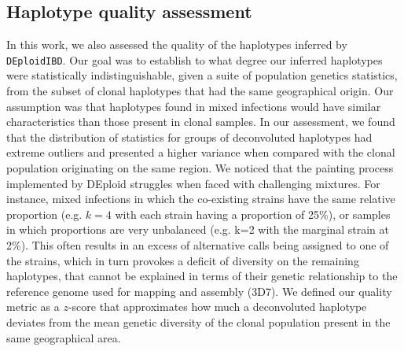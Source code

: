 \documentclass[9pt]{article}
\begin{document}





\subsection{Haplotype quality assessment}
\label{section:hap-quality}
In this work, we also assessed the quality of the haplotypes inferred by \texttt{DEploidIBD}. Our goal was to establish to what degree our inferred haplotypes were statistically indistinguishable, given a suite of population genetics statistics, from the subset of clonal haplotypes that had the same geographical origin. Our assumption was that haplotypes found in mixed infections would have similar characteristics than those present in clonal samples. In our assessment, we found that the distribution of statistics for groups of deconvoluted haplotypes had extreme outliers and presented a higher variance when compared with the clonal population originating on the same region. We noticed that the painting process implemented by DEploid struggles when faced with challenging mixtures. For instance, mixed infections in which the co-existing strains have the same relative proportion (e.g. $k=4$ with each strain having a proportion of 25\%), or samples in which proportions are very unbalanced (e.g. k=2 with the marginal strain at 2\%). This often results in an excess of alternative calls being assigned to one of the strains, which in turn provokes a deficit of diversity on the remaining haplotypes, that cannot be explained in terms of their genetic relationship to the reference genome used for mapping and assembly (3D7). We defined our quality metric as a $z$-score that approximates how much a deconvoluted haplotype deviates from the mean genetic diversity of the clonal population present in the same geographical area.
\end{document}

